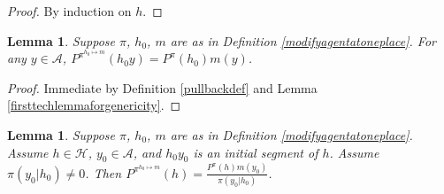 \documentclass[twoside]{article}
\newtheorem{lemma}[theorem]{Lemma}
\begin{document}
\begin{proof}
    By induction on $h$.
\end{proof}

\begin{lemma}
\label{thirdtechlemmaforgenericity}
    Suppose $\pi$, $h_0$, $m$ are as in Definition \ref{modifyagentatoneplace}.
    For any $y\in\mathcal A$,
    $P^{\pi^{h_0\mapsto m}}(h_0y)=P^\pi(h_0)m(y)$.
\end{lemma}

\begin{proof}
    Immediate by Definition \ref{pullbackdef} and Lemma \ref{firsttechlemmaforgenericity}.
\end{proof}

\begin{lemma}
\label{secondtechlemmaforgenericity}
    Suppose $\pi$, $h_0$, $m$ are as in Definition \ref{modifyagentatoneplace}.
    Assume $h\in\mathcal H$, $y_0\in\mathcal A$, and $h_0y_0$ is
    an initial segment of $h$. Assume $\pi(y_0|h_0)\not=0$. Then
    $P^{\pi^{h_0\mapsto m}}(h) = \frac{P^\pi(h)m(y_0)}{\pi(y_0|h_0)}$.
\end{lemma}
\end{document}
